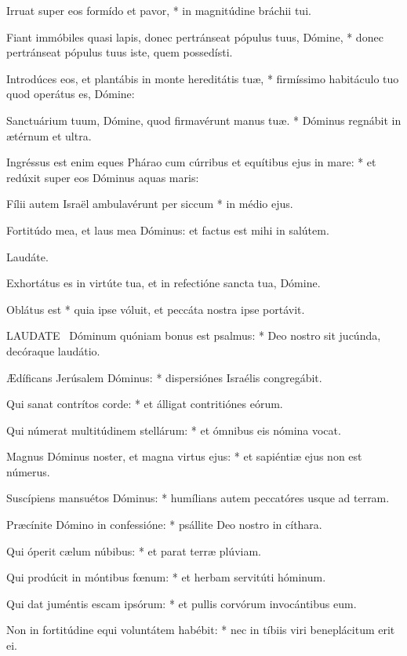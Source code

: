 Irruat super eos formído et pavor, * in magnitúdine bráchii tui.

Fiant immóbiles quasi lapis, donec pertránseat pópulus tuus, Dómine, * donec pertránseat pópulus tuus iste, quem possedísti.

Introdúces eos, et plantábis in monte hereditátis tuæ, * firmíssimo habitáculo tuo quod operátus es, Dómine:

Sanctuárium tuum, Dómine, quod firmavérunt manus tuæ. * Dóminus regnábit in ætérnum et ultra.

Ingréssus est enim eques Phárao cum cúrribus et equítibus ejus in mare: * et redúxit super eos Dóminus aquas maris:

Fílii autem Israël ambulavérunt per siccum * in médio ejus.

 Fortitúdo mea, et laus mea Dóminus: et factus est mihi in salútem.

 Laudáte. \textdagger


 Exhortátus es in virtúte tua, et in refectióne sancta tua, Dómine.

 Oblátus est * quia ipse vóluit, et peccáta nostra ipse portávit.


\lettrine[lines=2]{L}{AUDATE} \textdagger\ Dóminum quóniam bonus est psalmus: * Deo nostro sit jucúnda, decóraque laudátio.

Ædíficans Jerúsalem Dóminus: * dispersiónes Israélis congregábit.

Qui sanat contrítos corde: * et álligat contritiónes eórum.

Qui númerat multitúdinem stellárum: * et ómnibus eis nómina vocat.

Magnus Dóminus noster, et magna virtus ejus: * et sapiéntiæ ejus non est númerus.

Suscípiens mansuétos Dóminus: * humílians autem peccatóres usque ad terram.

Præcínite Dómino in confessióne: * psállite Deo nostro in cíthara.

Qui óperit cælum núbibus: * et parat terræ plúviam.

Qui prodúcit in móntibus fœnum: * et herbam servitúti hóminum.

Qui dat juméntis escam ipsórum: * et pullis corvórum invocántibus eum.

Non in fortitúdine equi voluntátem habébit: * nec in tíbiis viri beneplácitum erit ei.

